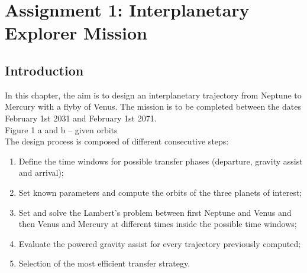 \documentclass[11pt,a4paper]{report}
\begin{document}
\printnomenclature
\tableofcontents

\part{Assignment 1: Interplanetary Explorer Mission}

\chapter{Introduction}
In this chapter, the aim is to design an interplanetary trajectory from Neptune to Mercury with a flyby of Venus. The mission is to be completed between the dates February 1st 2031 and February 1st 2071.\\
Figure 1 a and b – given orbits\\
The design process is composed of  different consecutive steps:\\
\begin{enumerate}
\item Define the time windows for possible transfer phases (departure, gravity assist and arrival);
\item Set known parameters and compute the orbits of the three planets of interest;
\item Set and solve the Lambert’s problem between first Neptune and Venus and then Venus and Mercury at different times inside the possible time windows;
\item Evaluate the powered gravity assist for every trajectory previously computed;
\item Selection of the most efficient transfer strategy.
\end{enumerate}
\end{document}
